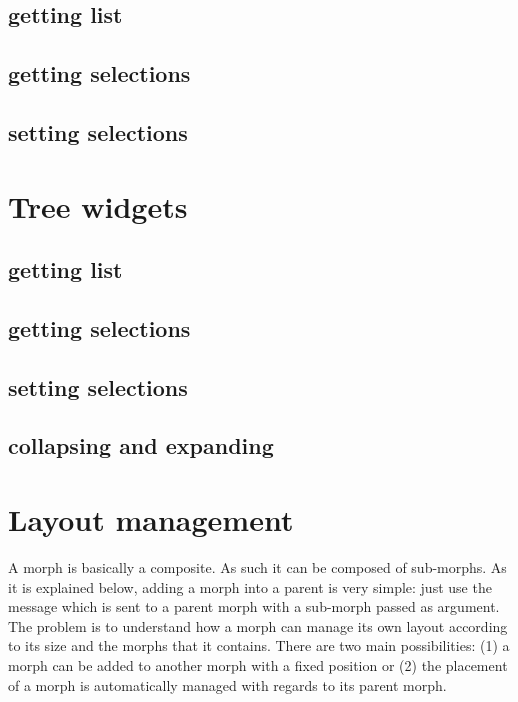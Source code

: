 \documentclass[a4paper,10pt,twoside]{book}
\begin{document}
\subsection{getting list}
\subsection{getting selections}
\subsection{setting selections}


\section{Tree widgets}
\subsection{getting list}
\subsection{getting selections}
\subsection{setting selections}
\subsection{collapsing and expanding}

\section{Layout management}


A morph is basically a composite. As such it can be composed of sub-morphs. As it is explained below, adding a morph into a parent is very simple: just use the  message which is sent to a parent morph with a sub-morph passed as argument. The problem is to understand how a morph can manage its own layout according to its size and the morphs that it contains. There are two main possibilities: (1) a morph can be added to another morph with a fixed position or (2) the placement of a morph is automatically managed with regards to its parent morph.
\end{document}
